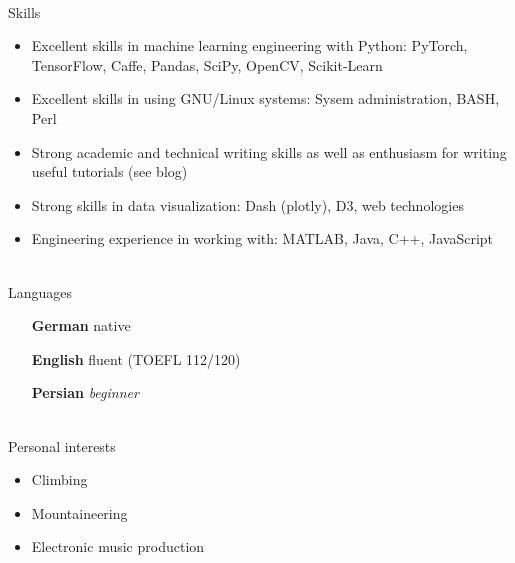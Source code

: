 \documentclass[8pt]{extarticle}
\newcommand*{\cvsect}[1]{
    \vspace{\baselineskip}
    \colorbox{primary}{\textcolor{white}{\MakeUppercase{\textbf{\large #1}}}}%
    \vspace{0.2\baselineskip}\\%
}
\renewcommand{\|}{\hspace{1.2mm}/\hspace{1.2mm}}
\begin{document}
\begin{multicols*}{2}
\cvsect*{Skills}
\begin{itemize}
    \item Excellent skills in machine learning engineering with Python: PyTorch, TensorFlow, Caffe, Pandas, SciPy, OpenCV, Scikit-Learn
    \item Excellent skills in using GNU/Linux systems: Sysem administration, BASH, Perl
    \item Strong academic and technical writing skills as well as enthusiasm for writing useful tutorials (see blog)
    \item Strong skills in data visualization: Dash (plotly), D3, web technologies
    \item Engineering experience in working with: MATLAB, Java, C++, JavaScript
\end{itemize}

\begin{minipage}[t]{.5\columnwidth}
    \cvsect*{Languages}
    \begin{itemize}[left=3.5em]
        \item[\textbf{German}] native
        \item[\textbf{English}] fluent (TOEFL 112/120)
        \item[\textbf{Persian}] \textit{beginner}
    \end{itemize}
\end{minipage}
\begin{minipage}[t]{.5\columnwidth}
    \cvsect*{Personal interests}
    \begin{itemize}
        \item Climbing
        \item Mountaineering
        \item Electronic music production
    \end{itemize}
\end{minipage}

\end{multicols*}
\end{document}
